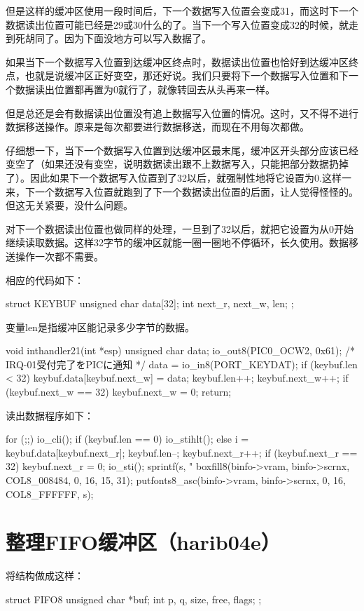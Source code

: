 但是这样的缓冲区使用一段时间后，下一个数据写入位置会变成31，而这时下一个数据读出位置可能已经是29或30什么的了。当下一个写入位置变成32的时候，就走到死胡同了。因为下面没地方可以写入数据了。

如果当下一个数据写入位置到达缓冲区终点时，数据读出位置也恰好到达缓冲区终点，也就是说缓冲区正好变空，那还好说。我们只要将下一个数据写入位置和下一个数据读出位置都再置为0就行了，就像转回去从头再来一样。

但是总还是会有数据读出位置没有追上数据写入位置的情况。这时，又不得不进行数据移送操作。原来是每次都要进行数据移送，而现在不用每次都做。

仔细想一下，当下一个数据写入位置到达缓冲区最末尾，缓冲区开头部分应该已经变空了（如果还没有变空，说明数据读出跟不上数据写入，只能把部分数据扔掉了）。因此如果下一个数据写入位置到了32以后，就强制性地将它设置为0.这样一来，下一个数据写入位置就跑到了下一个数据读出位置的后面，让人觉得怪怪的。但这无关紧要，没什么问题。

对下一个数据读出位置也做同样的处理，一旦到了32以后，就把它设置为从0开始继续读取数据。这样32字节的缓冲区就能一圈一圈地不停循环，长久使用。数据移送操作一次都不需要。

\cs

相应的代码如下：
\begin{code}[label=bootpack.h节选]
struct KEYBUF {
	unsigned char data[32];
	int next_r, next_w, len;
};
\end{code}

变量len是指缓冲区能记录多少字节的数据。

\begin{code}[label=int.c节选]
void inthandler21(int *esp)
{
	unsigned char data;
	io_out8(PIC0_OCW2, 0x61);	/* IRQ-01受付完了をPICに通知 */
	data = io_in8(PORT_KEYDAT);
	if (keybuf.len < 32) {
		keybuf.data[keybuf.next_w] = data;
		keybuf.len++;
		keybuf.next_w++;
		if (keybuf.next_w == 32) {
			keybuf.next_w = 0;
		}
	}
	return;
}
\end{code}

读出数据程序如下：
\begin{code}
	for (;;) {
		io_cli();
		if (keybuf.len == 0) {
			io_stihlt();
		} else {
			i = keybuf.data[keybuf.next_r];
			keybuf.len--;
			keybuf.next_r++;
			if (keybuf.next_r == 32) {
				keybuf.next_r = 0;
			}
			io_sti();
			sprintf(s, "%
			boxfill8(binfo->vram, binfo->scrnx, COL8_008484, 0, 16, 15, 31);
			putfonts8_asc(binfo->vram, binfo->scrnx, 0, 16, COL8_FFFFFF, s);
		}
	}
\end{code}
\section{	整理FIFO缓冲区（harib04e）	}
将结构做成这样：
\begin{code}
struct FIFO8 {
	unsigned char *buf;
	int p, q, size, free, flags;
};
\end{code}

